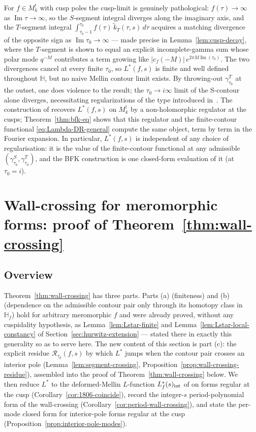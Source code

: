 \documentclass[11pt]{article}
\numberwithin{equation}{section}  %
\newcommand{\HH}{\mathbb{H}}
\DeclareMathOperator{\im}{Im}
\begin{document}
For $f \in M^!_k$ with cusp poles the cusp-limit is genuinely
pathological: $f(\tau) \to \infty$ as $\im\tau \to \infty$, so the
$S$-segment integral diverges along the imaginary axis, and the
$T$-segment integral $\int_{\tau_0 - 1}^{\tau_0}\! f(\tau)\,
\widetilde{k}_T(\tau, s)\,d\tau$ acquires a matching divergence of
the opposite sign as $\im\tau_0 \to \infty$ --- made precise in
Lemma~\ref{lem:cusp-decay}, where the $T$-segment is shown to equal an
explicit incomplete-gamma sum whose polar mode $q^{-M}$ contributes a
term growing like $|c_f(-M)|\,e^{2\pi M \im(\tau_0)}$.
The two divergences cancel at every finite $\tau_0$, so $L^*(f, s)$
is finite and well defined throughout $\HH$, but no naive Mellin
contour limit exists. By throwing-out $\gamma^T_{\tau_0}$ at the outset, 
one does violence to the result; the $\tau_0 \to i \infty$ limit of the S-contour 
alone diverges, necessitating regularizations of the type introduced in~\cite{BFK2011}. 
The construction of \cite{BFK2011} recovers
$L^*(f, s)$ on $M^!_k$ by a non-holomorphic regulator at the cusps;
Theorem~\ref{thm:bfk-eq} shows that this regulator and the
finite-contour functional \eqref{eq:Lambda-DR-general} compute the
same object, term by term in the Fourier expansion.  In particular,
$L^*(f, s)$ is independent of any choice of regularisation: it is
the value of the finite-contour functional at any admissible
$(\gamma^S_{\tau_0}, \gamma^T_{\tau_0})$, and the BFK construction is
one closed-form evaluation of it (at $\tau_0 = i$).


\section{Wall-crossing for meromorphic forms: proof of Theorem~\ref{thm:wall-crossing}}\label{sec:wall-crossing}

\subsection{Overview}\label{subsec:wall-crossing-overview}

Theorem~\ref{thm:wall-crossing} has three parts.  Parts (a)
(finiteness) and (b) (dependence on the admissible contour pair only
through its homotopy class in $\HH_f$) hold for arbitrary meromorphic
$f$ and were already proved, without any cuspidality hypothesis, as
Lemma~\ref{lem:Lstar-finite} and Lemma~\ref{lem:Lstar-local-constancy}
of Section~\ref{sec:hurwitz-extension} --- stated there in exactly this
generality so as to serve here.  The new content of this section is
part (c): the explicit residue $\mathcal{R}_{\tau_p}(f, s)$ by which
$L^*$ jumps when the contour pair crosses an interior pole
(Lemma~\ref{lem:segment-crossing},
Proposition~\ref{prop:wall-crossing-residue}), assembled into the proof
of Theorem~\ref{thm:wall-crossing} below.  We then reduce $L^*$ to the
deformed-Mellin $L$-function $L_f^*(s)_{\rm int}$ of \cite{1806} on
forms regular at the cusp (Corollary~\ref{cor:1806-coincide}), record
the integer-$s$ period-polynomial form of the wall-crossing
(Corollary~\ref{cor:period-wall-crossing}), and state the per-mode
closed form for interior-pole forms regular at the cusp
(Proposition~\ref{prop:interior-pole-modes}).
\end{document}
